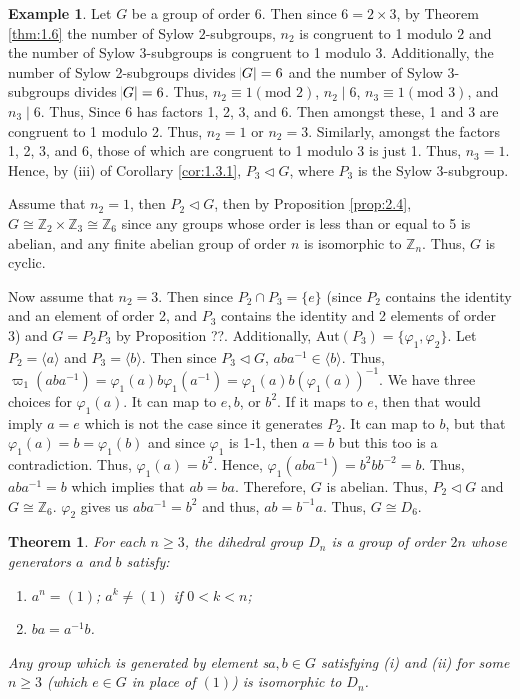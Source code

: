 \documentclass{article}
\makeatletter
\newtheorem{theorem}{Theorem}[section]
\theoremstyle{definition}
\theoremstyle{remark}
\let\oldproofname=\proofname
\renewcommand{\proofname}{\bf{\textit{\oldproofname}}}
\theoremstyle{definition}
\newtheorem{example}{Example}[section]
\renewenvironment{proof}[1][\proofname]{\par
  \pushQED{\qed}%
  \normalfont \topsep6\p@\@plus6\p@\relax
  \list{}{\leftmargin=0mm
          \rightmargin=0mm
          \settowidth{\itemindent}{\itshape#1}%
          \labelwidth=4mm
          \parsep=0pt \listparindent=0mm%
  }
  \item[\hskip\labelsep
        \itshape
    #1\@addpunct{.}]\ignorespaces
}{%
  \popQED\endlist\@endpefalse
}
\makeatother
\begin{document}
    \begin{example}
        Let $G$ be a group of order 6. Then since $6=2\times 3$, by Theorem \ref{thm:1.6} the number of Sylow $2$-subgroups, $n_2$ is congruent to 1 modulo $2$ and the number of Sylow 3-subgroups is congruent to 1 modulo 3. Additionally, the number of Sylow 2-subgroups divides $\abs{G}=6$ and the number of Sylow 3-subgroups divides $\abs{G}=6$. Thus, $n_2\equiv 1(\text{mod }2)$, $n_2\mid 6$, $n_3\equiv 1(\text{mod }3)$, and $n_3\mid 6$. Thus, Since 6 has factors 1, 2, 3, and 6. Then amongst these, 1 and 3 are congruent to 1 modulo 2. Thus, $n_2=1$ or $n_2=3$. Similarly, amongst the factors 1, 2, 3, and 6, those of which are congruent to 1 modulo 3 is just 1. Thus, $n_3=1$. Hence, by (iii) of Corollary \ref{cor:1.3.1}, $P_3\triangleleft G$, where $P_3$ is the Sylow 3-subgroup.\par Assume that $n_2=1$, then $P_2\triangleleft G$, then by Proposition \ref{prop:2.4}, $G\cong\mathbb{Z}_2\times\mathbb{Z}_3\cong\mathbb{Z}_6$ since any groups whose order is less than or equal to 5 is abelian, and any finite abelian group of order $n$ is isomorphic to $\mathbb{Z}_n$. Thus, $G$ is cyclic.\par Now assume that $n_2=3$. Then since $P_2\cap P_3=\{e\}$ (since $P_2$ contains the identity and an element of order 2, and $P_3$ contains the identity and 2 elements of order 3) and $G=P_2P_3$ by Proposition ??. Additionally, $\text{Aut}(P_3)=\{\varphi_1,\varphi_2\}$. Let $P_2=\langle a\rangle$ and $P_3=\langle b\rangle$. Then since $P_3\triangleleft G$, $aba^{-1}\in\langle b\rangle$. Thus, $\varpi_1(aba^{-1})=\varphi_1(a)b\varphi_1(a^{-1})=\varphi_1(a)b(\varphi_1(a))^{-1}$. We have three choices for $\varphi_1(a)$. It can map to $e, b$, or $b^2$. If it maps to $e$, then that would imply $a=e$ which is not the case since it generates $P_2$. It can map to $b$, but that $\varphi_1(a)=b=\varphi_1(b)$ and since $\varphi_1$ is 1-1, then $a=b$ but this too is a contradiction. Thus, $\varphi_1(a)=b^2$. Hence, $\varphi_1(aba^{-1})=b^2bb^{-2}=b$. Thus, $aba^{-1}=b$ which implies that $ab=ba$. Therefore, $G$ is abelian. Thus, $P_2\triangleleft G$ and $G\cong\mathbb{Z}_6$. $\varphi_2$ gives us $aba^{-1}=b^2$ and thus, $ab=b^{-1}a$. Thus, $G\cong D_6$.
    \end{example}
    
    \begin{theorem}\label{thm:2.1}
        For each $n\geq 3$, the dihedral group $D_n$ is a group of order $2n$ whose generators $a$ and $b$ satisfy:
        \begin{enumerate}[label=(\roman*)]
            \item $a^n=(1)$; $a^k\neq(1)$ if $0<k<n$;
            \item $ba=a^{-1}b$.
        \end{enumerate}
        
        \noindent Any group which is generated by element s$a,b\in G$ satisfying (i) and (ii) for some $n\geq 3$ (which $e\in G$ in place of $(1)$) is isomorphic to $D_n$.
    \end{theorem}
        \begin{proof}
    
        \end{proof}
        
\end{document}
